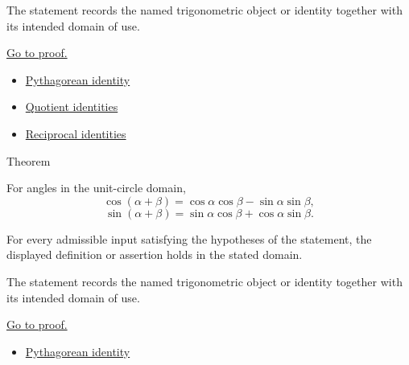 \begin{remark*}[Interpretation]
The statement records the named trigonometric object or identity together with
its intended domain of use.
\end{remark*}

\begin{remark*}[Proof]
\hyperref[prf:trig-tangent-pythagorean-identities]{Go to proof.}
\end{remark*}
\begin{dependencies}
\begin{itemize}
  \item \hyperref[thm:pythagorean-trig-identity]{Pythagorean identity}
  \item \hyperref[thm:trig-quotient-identities]{Quotient identities}
  \item \hyperref[thm:trig-reciprocal-identities]{Reciprocal identities}
\end{itemize}
\end{dependencies}



\begin{theorembox}{Theorem}
\begin{theorem}
\label{thm:trig-angle-sum-identities}
For angles in the unit-circle domain,
\[
  \cos(\alpha+\beta)=\cos\alpha\cos\beta-\sin\alpha\sin\beta,
\]
\[
  \sin(\alpha+\beta)=\sin\alpha\cos\beta+\cos\alpha\sin\beta.
\]
\end{theorem}
\end{theorembox}
\begin{remark*}
For every admissible input satisfying the hypotheses of the statement, the
displayed definition or assertion holds in the stated domain.
\end{remark*}

\begin{remark*}[Interpretation]
The statement records the named trigonometric object or identity together with
its intended domain of use.
\end{remark*}

\begin{remark*}[Proof]
\hyperref[prf:trig-angle-sum-identities]{Go to proof.}
\end{remark*}
\begin{dependencies}
\begin{itemize}
  \item \hyperref[thm:pythagorean-trig-identity]{Pythagorean identity}
\end{itemize}
\end{dependencies}

